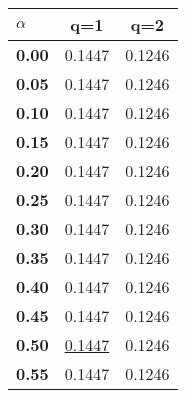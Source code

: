 \begin{tabular}{ | l || c | c |}
\hline
\textbf{$\alpha$} & \textbf{}q=1} & \textbf{}q=2} \\
\hline
\textbf{0.00} & 0.1447 & 0.1246\\
\hline
\textbf{0.05} & 0.1447 & 0.1246\\
\hline
\textbf{0.10} & 0.1447 & 0.1246\\
\hline
\textbf{0.15} & 0.1447 & 0.1246\\
\hline
\textbf{0.20} & 0.1447 & 0.1246\\
\hline
\textbf{0.25} & 0.1447 & 0.1246\\
\hline
\textbf{0.30} & 0.1447 & 0.1246\\
\hline
\textbf{0.35} & 0.1447 & 0.1246\\
\hline
\textbf{0.40} & 0.1447 & 0.1246\\
\hline
\textbf{0.45} & 0.1447 & 0.1246\\
\hline
\textbf{0.50} & \underline{0.1447} & 0.1246\\
\hline
\textbf{0.55} & 0.1447 & 0.1246\\
\hline
\end{tabular}
